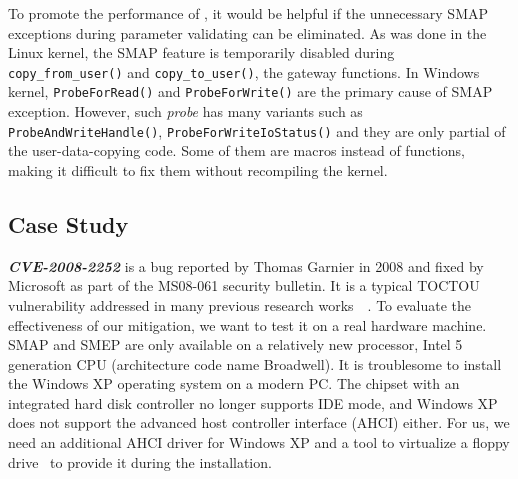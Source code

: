 



To promote the performance of \name, it would be helpful if  the unnecessary SMAP exceptions during parameter validating can be eliminated. As was done in the Linux kernel, the SMAP feature is temporarily disabled during \texttt{copy\_from\_user()} and \texttt{copy\_to\_user()}, the gateway functions. In Windows kernel, \texttt{ProbeForRead()} and \texttt{ProbeForWrite()} are the primary cause of SMAP exception. However, such \textit{probe} has many variants such as \texttt{ProbeAndWriteHandle()}, \texttt{ProbeForWriteIoStatus()} and they are only partial of the user-data-copying code. Some of them are macros instead of functions, making it difficult to fix them without recompiling the kernel. 

\subsection{Case Study}


\textbf{\textit{CVE-2008-2252}} is a bug reported by Thomas Garnier in 2008 and fixed by Microsoft as part of the MS08-061 security bulletin.  It is a typical TOCTOU vulnerability addressed in many previous research works~\cite{wang2019dftracker}~\cite{jurczyk2013identifying}. To evaluate the effectiveness of our mitigation, we want to test it on a real hardware machine. SMAP and SMEP are only available on a relatively new processor, Intel 5 generation CPU (architecture code name Broadwell). It is troublesome to install the Windows XP operating system on a modern PC. The chipset with an integrated hard disk controller no longer supports IDE mode, and Windows XP does not support the advanced host controller interface (AHCI) either. For us, we need an additional AHCI driver for Windows XP and a tool to virtualize a floppy drive~\cite{installxpskylake} to provide it during the installation.


